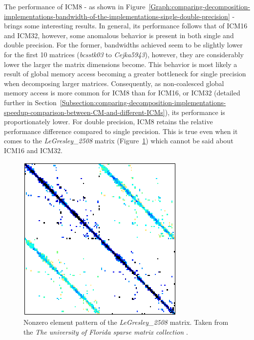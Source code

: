 The performance of ICM8 - as shown in Figure~\ref{Graph:comparing-decomposition-implementations-bandwidth-of-the-implementations-single-double-precision} - brings some interesting results. In general, its performance follows that of ICM16 and ICM32, however, some anomalous behavior is present in both single and double precision. For the former, bandwidths achieved seem to be slightly lower for the first 10 matrices (\textit{bcsstk03} to \textit{Cejka5943}), however, they are considerably lower the larger the matrix dimensions become. This behavior is most likely a result of global memory access becoming a greater bottleneck for single precision when decomposing larger matrices. Consequently, as non-coalesced global memory access is more common for ICM8 than for ICM16, or ICM32 (detailed further in Section~\ref{Subsection:comparing-decomposition-implementations-speedup-comparison-between-CM-and-different-ICMs}), its performance is proportionately lower. For double precision, ICM8 retains the relative performance difference compared to single precision. This is true even when it comes to the \textit{LeGresley\_2508} matrix (Figure~\ref{Figure:comparing-decomposition-implementations-bandwidth-of-the-implementations-matrix-legresley_2508}) which cannot be said about ICM16 and ICM32.

\begin{figure}
	\centering
	\includegraphics[width=.35\textwidth, keepaspectratio, clip]{images/ch3/matrices/legresley_2508.png}
	\caption{Nonzero element pattern of the \textit{LeGresley\_2508} matrix. Taken from the \emph{The university of Florida sparse matrix collection} \cite{Davis2011}.}
	\label{Figure:comparing-decomposition-implementations-bandwidth-of-the-implementations-matrix-legresley_2508}
\end{figure}

